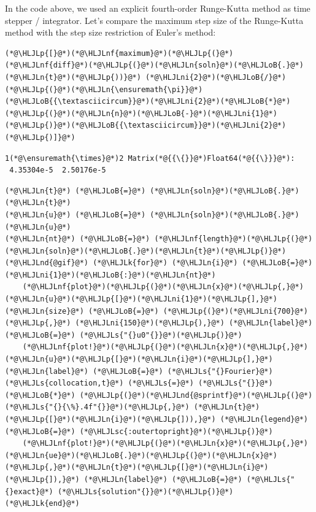 \documentclass[12pt,a4paper]{article}
\newcommand{\HLJLk}[1]{\textcolor[RGB]{148,91,176}{\textbf{#1}}}
\newcommand{\HLJLn}[1]{#1}
\newcommand{\HLJLnd}[1]{\textcolor[RGB]{214,102,97}{#1}}
\newcommand{\HLJLnf}[1]{\textcolor[RGB]{66,102,213}{#1}}
\newcommand{\HLJLs}[1]{\textcolor[RGB]{201,61,57}{#1}}
\newcommand{\HLJLsc}[1]{\textcolor[RGB]{201,61,57}{#1}}
\newcommand{\HLJLni}[1]{\textcolor[RGB]{59,151,46}{#1}}
\newcommand{\HLJLoB}[1]{\textcolor[RGB]{102,102,102}{\textbf{#1}}}
\newcommand{\HLJLp}[1]{#1}
\begin{document}
In the code above, we used an explicit fourth-order Runge-Kutta method as time stepper / integrator.  Let's compare the maximum step size of the Runge-Kutta method with the step size restriction of Euler's method:


\begin{lstlisting}
(*@\HLJLp{[}@*)(*@\HLJLnf{maximum}@*)(*@\HLJLp{(}@*)(*@\HLJLnf{diff}@*)(*@\HLJLp{(}@*)(*@\HLJLn{soln}@*)(*@\HLJLoB{.}@*)(*@\HLJLn{t}@*)(*@\HLJLp{))}@*) (*@\HLJLni{2}@*)(*@\HLJLoB{/}@*)(*@\HLJLp{(}@*)(*@\HLJLn{\ensuremath{\pi}}@*)(*@\HLJLoB{{\textasciicircum}}@*)(*@\HLJLni{2}@*)(*@\HLJLoB{*}@*)(*@\HLJLp{(}@*)(*@\HLJLn{n}@*)(*@\HLJLoB{-}@*)(*@\HLJLni{1}@*)(*@\HLJLp{)}@*)(*@\HLJLoB{{\textasciicircum}}@*)(*@\HLJLni{2}@*)(*@\HLJLp{)]}@*)
\end{lstlisting}

\begin{lstlisting}
1(*@\ensuremath{\times}@*)2 Matrix(*@{{\{}}@*)Float64(*@{{\}}}@*):
 4.35304e-5  2.50176e-5
\end{lstlisting}


\begin{lstlisting}
(*@\HLJLn{t}@*) (*@\HLJLoB{=}@*) (*@\HLJLn{soln}@*)(*@\HLJLoB{.}@*)(*@\HLJLn{t}@*)
(*@\HLJLn{u}@*) (*@\HLJLoB{=}@*) (*@\HLJLn{soln}@*)(*@\HLJLoB{.}@*)(*@\HLJLn{u}@*)
(*@\HLJLn{nt}@*) (*@\HLJLoB{=}@*) (*@\HLJLnf{length}@*)(*@\HLJLp{(}@*)(*@\HLJLn{soln}@*)(*@\HLJLoB{.}@*)(*@\HLJLn{t}@*)(*@\HLJLp{)}@*)
(*@\HLJLnd{@gif}@*) (*@\HLJLk{for}@*) (*@\HLJLn{i}@*) (*@\HLJLoB{=}@*) (*@\HLJLni{1}@*)(*@\HLJLoB{:}@*)(*@\HLJLn{nt}@*) 
    (*@\HLJLnf{plot}@*)(*@\HLJLp{(}@*)(*@\HLJLn{x}@*)(*@\HLJLp{,}@*) (*@\HLJLn{u}@*)(*@\HLJLp{[}@*)(*@\HLJLni{1}@*)(*@\HLJLp{],}@*) (*@\HLJLn{size}@*) (*@\HLJLoB{=}@*) (*@\HLJLp{(}@*)(*@\HLJLni{700}@*)(*@\HLJLp{,}@*) (*@\HLJLni{150}@*)(*@\HLJLp{),}@*) (*@\HLJLn{label}@*) (*@\HLJLoB{=}@*) (*@\HLJLs{"{}u0"{}}@*)(*@\HLJLp{)}@*)
    (*@\HLJLnf{plot!}@*)(*@\HLJLp{(}@*)(*@\HLJLn{x}@*)(*@\HLJLp{,}@*) (*@\HLJLn{u}@*)(*@\HLJLp{[}@*)(*@\HLJLn{i}@*)(*@\HLJLp{],}@*) (*@\HLJLn{label}@*) (*@\HLJLoB{=}@*) (*@\HLJLs{"{}Fourier}@*) (*@\HLJLs{collocation,t}@*) (*@\HLJLs{=}@*) (*@\HLJLs{"{}}@*) (*@\HLJLoB{*}@*) (*@\HLJLp{(}@*)(*@\HLJLnd{@sprintf}@*)(*@\HLJLp{(}@*)(*@\HLJLs{"{}{\%}.4f"{}}@*)(*@\HLJLp{,}@*) (*@\HLJLn{t}@*)(*@\HLJLp{[}@*)(*@\HLJLn{i}@*)(*@\HLJLp{])),}@*) (*@\HLJLn{legend}@*) (*@\HLJLoB{=}@*) (*@\HLJLsc{:outertopright}@*)(*@\HLJLp{)}@*)
    (*@\HLJLnf{plot!}@*)(*@\HLJLp{(}@*)(*@\HLJLn{x}@*)(*@\HLJLp{,}@*) (*@\HLJLn{ue}@*)(*@\HLJLoB{.}@*)(*@\HLJLp{(}@*)(*@\HLJLn{x}@*)(*@\HLJLp{,}@*)(*@\HLJLn{t}@*)(*@\HLJLp{[}@*)(*@\HLJLn{i}@*)(*@\HLJLp{]),}@*) (*@\HLJLn{label}@*) (*@\HLJLoB{=}@*) (*@\HLJLs{"{}exact}@*) (*@\HLJLs{solution"{}}@*)(*@\HLJLp{)}@*)
(*@\HLJLk{end}@*)
\end{lstlisting}
\end{document}
